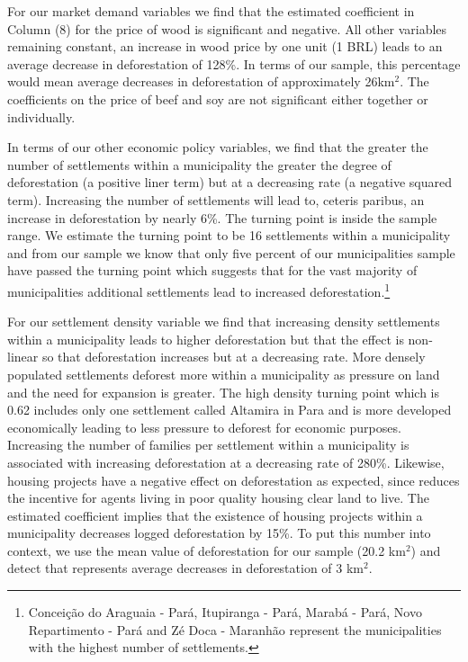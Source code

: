 For our market demand variables we find that the estimated coefficient in Column (8) for the price of wood is significant and negative. All other variables remaining constant, an increase in wood price by one unit (1 BRL) leads to an average decrease in deforestation of 128\%. In terms of our sample, this percentage would mean average decreases in deforestation of approximately 26km$^{2}$. The coefficients on the price of beef and soy are not significant either together or individually.

In terms of our other economic policy variables, we find that the greater the number of settlements within a municipality the greater the degree of deforestation (a positive liner term) but at a decreasing rate (a negative squared term). Increasing the number of settlements will lead to, ceteris paribus, an increase in deforestation by nearly 6\%. The turning point is inside the sample range. We estimate the turning point to be 16 settlements within a municipality and from our sample we know that only five percent of our municipalities sample have passed the turning point which suggests that for the vast majority of municipalities additional settlements lead to increased deforestation.\footnote{Concei\c{c}\~{a}o do Araguaia - Par\'{a}, Itupiranga - Par\'{a}, Marab\'{a} - Par\'{a}, Novo Repartimento - Par\'{a} and Z\'{e} Doca - Maranh\~{a}o represent the municipalities with the highest number of settlements.} 

For our settlement density variable we find that increasing density settlements within a municipality leads to higher deforestation but that the effect is non-linear so that deforestation increases but at a decreasing rate. More densely populated settlements deforest more within a municipality as pressure on land and the need for expansion is greater. The high density turning point which is 0.62 includes only one settlement called Altamira in Para and is more developed economically leading to less pressure to deforest for economic purposes. Increasing the number of families per settlement within a municipality is associated with increasing deforestation at a decreasing rate of 280\%. Likewise, housing projects have a negative effect on deforestation as expected, since reduces the incentive for agents living in poor quality housing clear land to live. The estimated coefficient implies that the existence of housing projects within a municipality decreases logged deforestation by 15\%. To put this number into context, we use the mean value of deforestation for our sample (20.2 km$^{2}$) and detect that represents average decreases in deforestation of 3 km$^{2}$.

